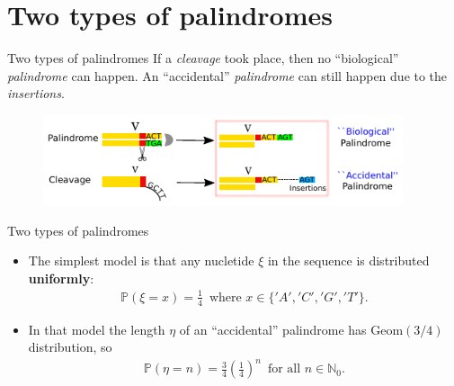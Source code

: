 \documentclass{beamer}\usepackage[]{graphicx}\usepackage[]{color}
\begin{document}
\section{Two types of palindromes}
\begin{frame}{Two types of palindromes}
  If a \textit{cleavage} took place, then no {\color{blue} ``biological''} \textit{palindrome} can happen. 
  An {\color{blue} ``accidental''} \textit{palindrome} can still happen due to the \textit{insertions}.
  
 \begin{figure}[h]
   \includegraphics[width=300pt]{Pictures/two_types_palindromes.pdf}
 \end{figure}
\end{frame}

\begin{frame}{Two types of palindromes}
  \begin{itemize}
    \item The simplest model is that any nucletide $\xi$ in the sequence is distributed \textbf{uniformly}:
    \begin{gather*}
      \mathbb P(\xi = x) = \frac{1}{4} \, \mbox{ where } x \in \{'A', 'C', 'G','T'\}.
    \end{gather*}
    \item In that model the length $\eta$ of an ``accidental'' palindrome has $\mathrm{Geom}(3/4)$ distribution, so
    \begin{gather*}
      \mathbb P(\eta = n) = \frac{3}{4} \left(\frac{1}{4}\right)^n \, \mbox { for all } n \in \mathbb N_0.
    \end{gather*}
  \end{itemize}
\end{frame}
\end{document}
